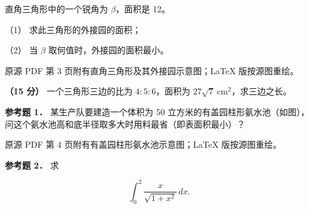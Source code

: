 \begin{question}
直角三角形中的一个锐角为 $\beta$，面积是 12。

（1） 求此三角形的外接园的面积；

（2） 当 $\beta$ 取何值时，外接园的面积最小。

\begin{gktip}
原源 PDF 第 3 页附有直角三角形及其外接园示意图；LaTeX 版按源图重绘。
\end{gktip}
\nopagebreak[4]
\begin{center}\end{center}
\nopagebreak[4]
\Needspace{0.4\textheight}
\end{question}
\begin{question}
\textbf{（15 分）} 一个三角形三边的比为 $4:5:6$，面积为 $27\sqrt7\ \mathrm{cm^2}$，求三边之长。

\textbf{参考题 1．} 某生产队要建造一个体积为 50 立方米的有盖园柱形氨水池（如图），问这个氨水池高和底半径取多大时用料最省（即表面积最小）？

\begin{gktip}
原源 PDF 第 4 页附有有盖园柱形氨水池示意图；LaTeX 版按源图重绘。
\end{gktip}
\nopagebreak[4]
\begin{center}\end{center}
\nopagebreak[4]
\textbf{参考题 2．} 求

\nopagebreak[4]
\[
\int_0^2\frac{x}{\sqrt{1+x^2}}\,dx.
\]

\end{question}